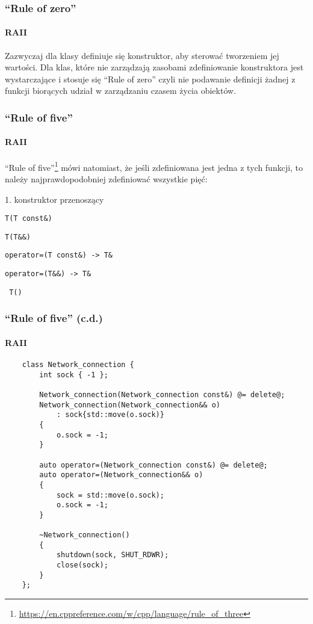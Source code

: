 \documentclass[aspectratio=169,10pt]{beamer}
\begin{document}
\begin{frame}
    \frametitle{``Rule of zero''}
    \framesubtitle{RAII}

    Zazwyczaj dla klasy definiuje się konstruktor, aby sterować tworzeniem jej
    wartości. Dla klas, które nie zarządzają zasobami zdefiniowanie konstruktora
    jest wystarczające i stosuje się ``Rule of zero'' czyli nie podawanie
    definicji żadnej z funkcji biorących udział w zarządzaniu czasem życia
    obiektów.
\end{frame}

\begin{frame}
    \frametitle{``Rule of five''}
    \framesubtitle{RAII}

    ``Rule of
    five''\footnote{\url{https://en.cppreference.com/w/cpp/language/rule_of_three}}
    mówi natomiast, że jeśli zdefiniowana jest jedna z tych funkcji, to należy
    najprawdopodobniej zdefiniować wszystkie pięć:

    \vspace{1em}

    \begin{labeling}{1. konstruktor przenoszący}
        \item[1. konstruktor kopiujący] \texttt{T(T const\&)}
        \item[2. konstruktor przenoszący] \texttt{T(T\&\&)}
        \item[3. kopiujący \texttt{operator=}] \texttt{operator=(T const\&) -> T\&}
        \item[4. przenoszący \texttt{operator=}] \texttt{operator=(T\&\&) -> T\&}
        \item[5. destruktor] \texttt{~T()}
    \end{labeling}
\end{frame}

\begin{frame}[fragile]
    \frametitle{``Rule of five'' (c.d.)}
    \framesubtitle{RAII}

    {\tiny
    \begin{lstlisting}
    class Network_connection {
        int sock { -1 };

        Network_connection(Network_connection const&) @= delete@;
        Network_connection(Network_connection&& o)
            : sock{std::move(o.sock)}
        {
            o.sock = -1;
        }

        auto operator=(Network_connection const&) @= delete@;
        auto operator=(Network_connection&& o)
        {
            sock = std::move(o.sock);
            o.sock = -1;
        }

        ~Network_connection()
        {
            shutdown(sock, SHUT_RDWR);
            close(sock);
        }
    };
    \end{lstlisting}}
\end{frame}
\end{document}
